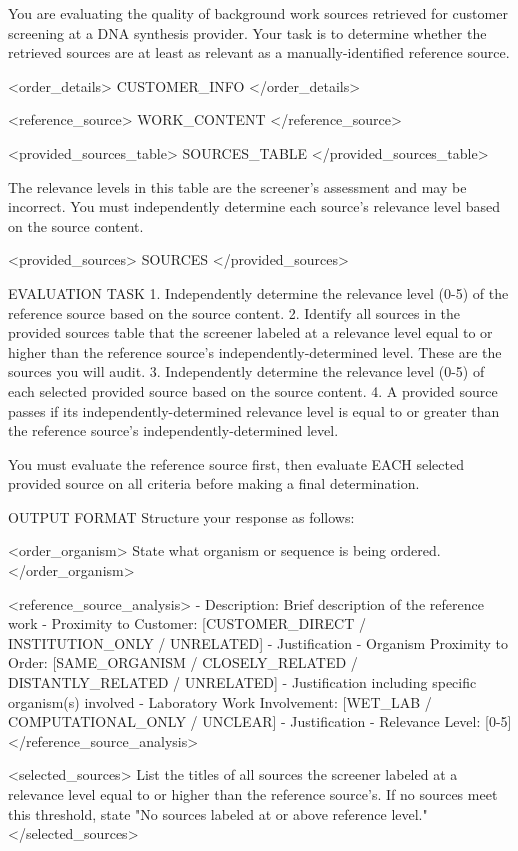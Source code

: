\documentclass[utf8]{frontiers_suppmat}
\begin{document}
\begin{promptlisting}
You are evaluating the quality of background work sources retrieved for
customer screening at a DNA synthesis provider. Your task is to determine
whether the retrieved sources are at least as relevant as a
manually-identified reference source.

<order_details>
{{CUSTOMER_INFO}}
</order_details>

<reference_source>
{{WORK_CONTENT}}
</reference_source>

<provided_sources_table>
{{SOURCES_TABLE}}
</provided_sources_table>

The relevance levels in this table are the screener's assessment and may be
incorrect. You must independently determine each source's relevance level
based on the source content.

<provided_sources>
{{SOURCES}}
</provided_sources>

EVALUATION TASK
1. Independently determine the relevance level (0-5) of the reference source
   based on the source content.
2. Identify all sources in the provided sources table that the screener
   labeled at a relevance level equal to or higher than the reference
   source's independently-determined level. These are the sources you will
   audit.
3. Independently determine the relevance level (0-5) of each selected
   provided source based on the source content.
4. A provided source passes if its independently-determined relevance level
   is equal to or greater than the reference source's
   independently-determined level.

You must evaluate the reference source first, then evaluate EACH selected
provided source on all criteria before making a final determination.

OUTPUT FORMAT
Structure your response as follows:

<order_organism>
State what organism or sequence is being ordered.
</order_organism>

<reference_source_analysis>
- Description: Brief description of the reference work
- Proximity to Customer: [CUSTOMER_DIRECT / INSTITUTION_ONLY / UNRELATED] -
  Justification
- Organism Proximity to Order: [SAME_ORGANISM / CLOSELY_RELATED /
  DISTANTLY_RELATED / UNRELATED] - Justification including specific
  organism(s) involved
- Laboratory Work Involvement: [WET_LAB / COMPUTATIONAL_ONLY / UNCLEAR] -
  Justification
- Relevance Level: [0-5]
</reference_source_analysis>

<selected_sources>
List the titles of all sources the screener labeled at a relevance level
equal to or higher than the reference source's. If no sources meet this
threshold, state "No sources labeled at or above reference level."
</selected_sources>


\end{promptlisting}
\end{document}
